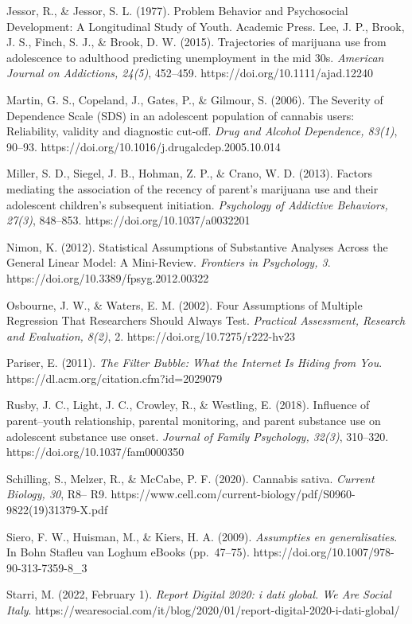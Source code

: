 \documentclass[
  letterpaper,
  DIV=11,
  numbers=noendperiod]{scrartcl}
\begin{document}
Jessor, R., \& Jessor, S. L. (1977). Problem Behavior and Psychosocial
Development: A Longitudinal Study of Youth. Academic Press. Lee, J. P.,
Brook, J. S., Finch, S. J., \& Brook, D. W. (2015). Trajectories of
marijuana use from adolescence to adulthood predicting unemployment in
the mid 30s. \emph{American Journal on Addictions, 24(5)}, 452--459.
https://doi.org/10.1111/ajad.12240

Martin, G. S., Copeland, J., Gates, P., \& Gilmour, S. (2006). The
Severity of Dependence Scale (SDS) in an adolescent population of
cannabis users: Reliability, validity and diagnostic cut-off. \emph{Drug
and Alcohol Dependence, 83(1)}, 90--93.
https://doi.org/10.1016/j.drugalcdep.2005.10.014

Miller, S. D., Siegel, J. B., Hohman, Z. P., \& Crano, W. D. (2013).
Factors mediating the association of the recency of parent's marijuana
use and their adolescent children's subsequent initiation.
\emph{Psychology of Addictive Behaviors, 27(3)}, 848--853.
https://doi.org/10.1037/a0032201

Nimon, K. (2012). Statistical Assumptions of Substantive Analyses Across
the General Linear Model: A Mini-Review. \emph{Frontiers in Psychology,
3}. https://doi.org/10.3389/fpsyg.2012.00322

Osbourne, J. W., \& Waters, E. M. (2002). Four Assumptions of Multiple
Regression That Researchers Should Always Test. \emph{Practical
Assessment, Research and Evaluation, 8(2)}, 2.
https://doi.org/10.7275/r222-hv23

Pariser, E. (2011). \emph{The Filter Bubble: What the Internet Is Hiding
from You}. https://dl.acm.org/citation.cfm?id=2029079

Rusby, J. C., Light, J. C., Crowley, R., \& Westling, E. (2018).
Influence of parent--youth relationship, parental monitoring, and parent
substance use on adolescent substance use onset. \emph{Journal of Family
Psychology, 32(3)}, 310--320. https://doi.org/10.1037/fam0000350

Schilling, S., Melzer, R., \& McCabe, P. F. (2020). Cannabis sativa.
\emph{Current Biology, 30}, R8-- R9.
https://www.cell.com/current-biology/pdf/S0960-9822(19)31379-X.pdf

Siero, F. W., Huisman, M., \& Kiers, H. A. (2009). \emph{Assumpties en
generalisaties}. In Bohn Stafleu van Loghum eBooks (pp.~47--75).
https://doi.org/10.1007/978-90-313-7359-8\_3

Starri, M. (2022, February 1). \emph{Report Digital 2020: i dati global.
We Are Social Italy}.
https://wearesocial.com/it/blog/2020/01/report-digital-2020-i-dati-global/
\end{document}
